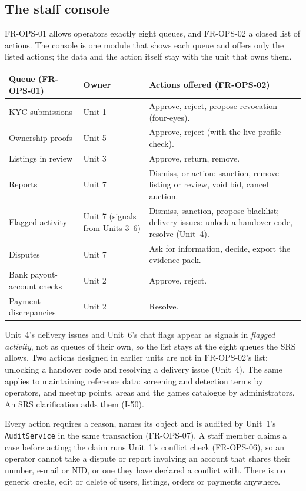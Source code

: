 \documentclass[11pt,a4paper]{article}
\newenvironment{dtable}[1]{\small\begin{longtable}{#1}}{\end{longtable}}
\begin{document}
\subsection{The staff console}
\label{sec:console}
FR-OPS-01 allows operators exactly eight queues, and FR-OPS-02 a closed list of actions. The console is one module that shows each queue and offers only the listed actions; the data and the action itself stay with the unit that owns them.
\begin{dtable}{@{}>{\raggedright\arraybackslash}p{4.0cm}>{\raggedright\arraybackslash}p{3.0cm}>{\raggedright\arraybackslash}p{8.2cm}@{}}
\toprule
\textbf{Queue (FR-OPS-01)} & \textbf{Owner} & \textbf{Actions offered (FR-OPS-02)} \\ \midrule \endhead
KYC submissions & Unit 1 & Approve, reject, propose revocation (four-eyes). \\
Ownership proofs & Unit 5 & Approve, reject (with the live-profile check). \\
Listings in review & Unit 3 & Approve, return, remove. \\
Reports & Unit 7 & Dismiss, or action: sanction, remove listing or review, void bid, cancel auction. \\
Flagged activity & Unit 7 (signals from Units 3--6) & Dismiss, sanction, propose blacklist; delivery issues: unlock a handover code, resolve (Unit~4). \\
Disputes & Unit 7 & Ask for information, decide, export the evidence pack. \\
Bank payout-account checks & Unit 2 & Approve, reject. \\
Payment discrepancies & Unit 2 & Resolve. \\
\bottomrule
\end{dtable}
Unit~4's delivery issues and Unit~6's chat flags appear as signals in \emph{flagged activity}, not as queues of their own, so the list stays at the eight queues the SRS allows. Two actions designed in earlier units are not in FR-OPS-02's list: unlocking a handover code and resolving a delivery issue (Unit~4). The same applies to maintaining reference data: screening and detection terms by operators, and meetup points, areas and the games catalogue by administrators. An SRS clarification adds them (I-50).

Every action requires a reason, names its object and is audited by Unit~1's \texttt{AuditService} in the same transaction (FR-OPS-07). A staff member claims a case before acting; the claim runs Unit~1's conflict check (FR-OPS-06), so an operator cannot take a dispute or report involving an account that shares their number, e-mail or NID, or one they have declared a conflict with. There is no generic create, edit or delete of users, listings, orders or payments anywhere.
\end{document}
